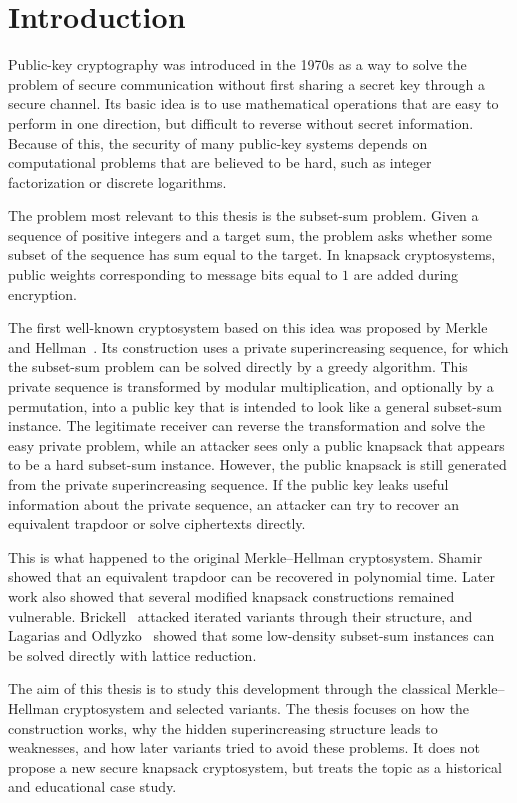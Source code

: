 \chapter*{Introduction}

Public-key cryptography was introduced in the 1970s as a way to solve the
problem of secure communication without first sharing a secret key through a
secure channel. Its basic idea is to use mathematical operations that are easy
to perform in one direction, but difficult to reverse without secret
information. Because of this, the security of many public-key systems depends
on computational problems that are believed to be hard, such as integer
factorization or discrete logarithms.

The problem most relevant to this thesis is the subset-sum problem. Given a
sequence of positive integers and a target sum, the problem asks whether some
subset of the sequence has sum equal to the target. In knapsack cryptosystems,
public weights corresponding to message bits equal to $1$ are added during
encryption.

The first well-known cryptosystem based on this idea was proposed by Merkle and
Hellman~\cite{MerkleHellman1978}. Its construction uses a private
superincreasing sequence, for which the subset-sum problem can be solved
directly by a greedy algorithm. This private sequence is transformed by modular
multiplication, and optionally by a permutation, into a public key that is
intended to look like a general subset-sum instance. The legitimate receiver
can reverse the transformation and solve the easy private problem, while an
attacker sees only a public knapsack that appears to be a hard subset-sum
instance. However, the public knapsack is still generated from the private
superincreasing sequence. If the public key leaks useful information about the
private sequence, an attacker can try to recover an equivalent trapdoor or
solve ciphertexts directly.

This is what happened to the original Merkle--Hellman cryptosystem.
Shamir~\cite{Shamir1982} showed that an equivalent trapdoor can be recovered in
polynomial time. Later work also showed that several modified knapsack
constructions remained vulnerable. Brickell~\cite{Brickell1984} attacked
iterated variants through their structure, and Lagarias and
Odlyzko~\cite{LagariasOdlyzko1985} showed that some low-density subset-sum
instances can be solved directly with lattice reduction.

The aim of this thesis is to study this development through the classical
Merkle--Hellman cryptosystem and selected variants. The thesis focuses on how
the construction works, why the hidden superincreasing structure leads to
weaknesses, and how later variants tried to avoid these problems. It does not
propose a new secure knapsack cryptosystem, but treats the topic as a
historical and educational case study.

